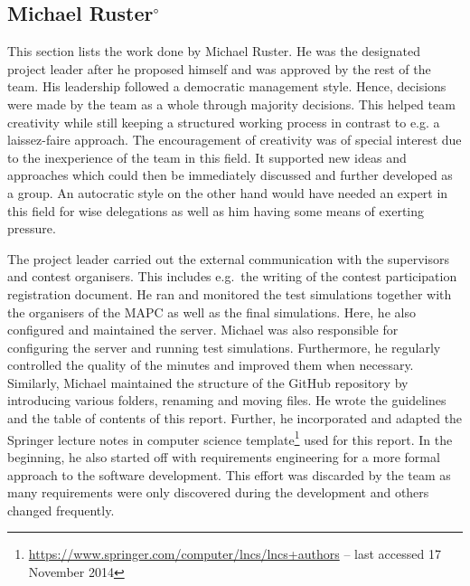 \subsection[Michael Ruster]{Michael Ruster$^{\circ}$}
This section lists the work done by Michael Ruster.
He was the designated project leader after he proposed himself and was approved by the rest of the team.
His leadership followed a democratic management style.
Hence, decisions were made by the team as a whole through majority decisions.
This helped team creativity while still keeping a structured working process in contrast to e.g. a laissez-faire approach.
The encouragement of creativity was of special interest due to the inexperience of the team in this field.
It supported new ideas and approaches which could then be immediately discussed and further developed as a group.
An autocratic style on the other hand would have needed an expert in this field for wise delegations as well as him having some means of exerting pressure.

The project leader carried out the external communication with the supervisors and contest organisers.
This includes e.g.\ the writing of the contest participation registration document.
He ran and monitored the test simulations together with the organisers of the MAPC as well as the final simulations.
Here, he also configured and maintained the server.
Michael was also responsible for configuring the server and running test simulations.
Furthermore, he regularly controlled the quality of the minutes and improved them when necessary.
Similarly, Michael maintained the structure of the GitHub repository by introducing various folders, renaming and moving files.
He wrote the guidelines and the table of contents of this report.
Further, he incorporated and adapted the Springer lecture notes in computer science template\footnote{\url{https://www.springer.com/computer/lncs/lncs+authors} -- last accessed 17 November 2014} used for this report.
In the beginning, he also started off with requirements engineering for a more formal approach to the software development.
This effort was discarded by the team as many requirements were only discovered during the development and others changed frequently.

